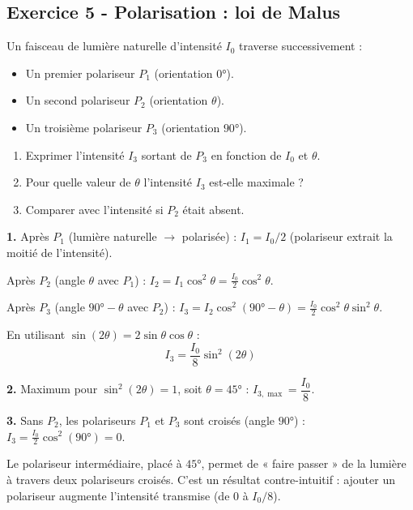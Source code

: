\documentclass[12pt,a4paper]{article}
\begin{document}
\subsection*{Exercice 5 - Polarisation : loi de Malus \niveau{\difficile}}

\begin{boiteexercice}
Un faisceau de lumière naturelle d'intensité $I_0$ traverse successivement :
\begin{itemize}[nosep]
  \item Un premier polariseur $P_1$ (orientation $0°$).
  \item Un second polariseur $P_2$ (orientation $\theta$).
  \item Un troisième polariseur $P_3$ (orientation $90°$).
\end{itemize}
\begin{enumerate}
  \item Exprimer l'intensité $I_3$ sortant de $P_3$ en fonction de $I_0$ et $\theta$.
  \item Pour quelle valeur de $\theta$ l'intensité $I_3$ est-elle maximale ?
  \item Comparer avec l'intensité si $P_2$ était absent.
\end{enumerate}
\end{boiteexercice}

\begin{boitecorrige}
\textbf{1.} Après $P_1$ (lumière naturelle $\to$ polarisée) : $I_1 = I_0/2$ (polariseur extrait la moitié de l'intensité).

Après $P_2$ (angle $\theta$ avec $P_1$) : $I_2 = I_1\cos^2\theta = \frac{I_0}{2}\cos^2\theta$.

Après $P_3$ (angle $90°-\theta$ avec $P_2$) : $I_3 = I_2\cos^2(90°-\theta) = \frac{I_0}{2}\cos^2\theta\sin^2\theta$.

En utilisant $\sin(2\theta)=2\sin\theta\cos\theta$ :
\[
\boxed{I_3 = \frac{I_0}{8}\sin^2(2\theta)}
\]

\textbf{2.} Maximum pour $\sin^2(2\theta)=1$, soit $\theta=45°$ : $I_{3,\max} = \dfrac{I_0}{8}$.

\textbf{3.} Sans $P_2$, les polariseurs $P_1$ et $P_3$ sont croisés (angle $90°$) : $I_3=\frac{I_0}{2}\cos^2(90°)=0$.

Le polariseur intermédiaire, placé à $45°$, permet de « faire passer » de la lumière à travers deux polariseurs croisés. C'est un résultat contre-intuitif : ajouter un polariseur augmente l'intensité transmise (de 0 à $I_0/8$).
\end{boitecorrige}
\end{document}
